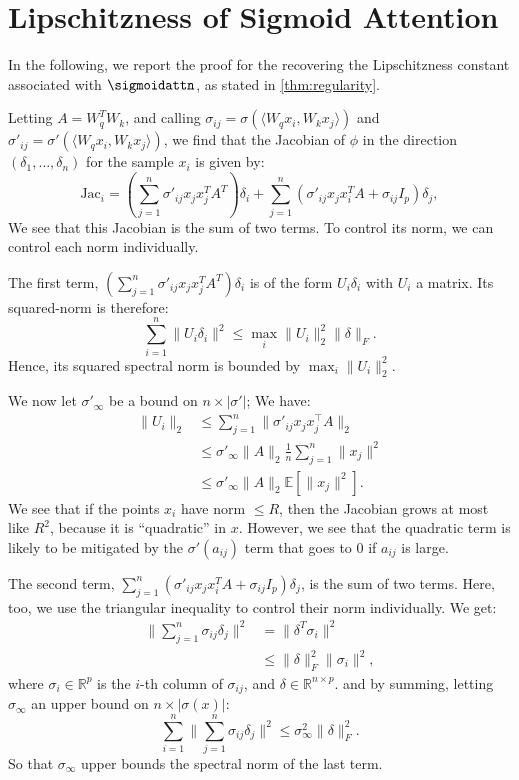 \section{Lipschitzness of Sigmoid Attention}
\label{app:lipschitz_proof}
In the following, we report the proof for the recovering the Lipschitzness constant associated with $\sigmoidattn$, as stated in \cref{thm:regularity}.

Letting $A = W_q^T W_k$, and calling $\sigma_{ij} = \sigma(\langle W_qx_i, W_kx_j\rangle)$ and $\sigma'_{ij} = \sigma'(\langle W_qx_i, W_kx_j\rangle)$, we find that the Jacobian of $\phi$ in the direction $(\delta_1, \dots, \delta_n)$ for the sample $x_i$ is given by:
\begin{equation}
    \mathrm{Jac}_i = \left(\sum_{j=1}^n\sigma'_{ij}x_jx_j^TA^T\right)\delta_i +  \sum_{j=1}^n\left(\sigma'_{ij}x_jx_i^TA + \sigma_{ij}I_p\right)\delta_j,
\end{equation}
We see that this Jacobian is the sum of two terms. To control its norm, we can control each norm individually. 

The first term, $\left(\sum_{j=1}^n\sigma'_{ij}x_jx_j^TA^T\right)\delta_i$ is of the form $U_i\delta_i$ with $U_i$ a matrix. 
Its squared-norm is therefore:
\begin{equation}
    \sum_{i=1}^n \|U_i\delta_i\|^2 \leq \max_{i}\|U_i\|_2^2 \|\delta\|_F .
\end{equation}
Hence, its squared spectral norm is bounded by $\max_{i}\|U_i\|_2^2$.

We now let $\sigma'_{\infty}$ be a bound on $n\times |\sigma'|$; 
We have: 
\begin{align}
\|U_i\|_2 & \leq \sum_{j=1}^n\|\sigma'_{ij}x_jx_j^{\top}A\|_2 \\
& \leq \sigma'_{\infty}\|A\|_2\frac1n \sum_{j=1}^n \|x_j\|^2 \\
&\leq \sigma'_{\infty}\|A\|_2 \mathbb{E}[\|x_j\|^2].
\label{eqn:lip_bound_first}
\end{align}
We see that if the points $x_i$ have norm $\leq R$, then the Jacobian grows at most like $R^2$, because it is ``quadratic'' in $x$.
However, we see that the quadratic term is likely to be mitigated by the $\sigma'(a_{ij})$ term that goes to $0$ if $a_{ij}$ is large.

The second term, $\sum_{j=1}^n\left(\sigma'_{ij}x_jx_i^TA + \sigma_{ij}I_p\right)\delta_j$, is the sum of two terms. Here, too, we use the triangular inequality to control their norm individually. We get:
\begin{align}
    \|\sum_{j=1}^n\sigma_{ij}\delta_j\|^2 &=\|\delta^T \sigma_i\|^2 \\
    &\leq \|\delta\|_F^2 \|\sigma_i\|^2,
\end{align}
where $\sigma_i\in\mathbb{R}^p$ is the $i$-th column of $\sigma_{ij}$, and $\delta\in \mathbb{R}^{n\times p}$.
and by summing, letting $\sigma_{\infty}$ an upper bound on $n\times |\sigma(x)|$:
\begin{equation}
    \sum_{i=1}^n\|\sum_{j=1}^n\sigma_{ij}\delta_j\|^2 \leq \sigma_{\infty}^2 \|\delta\|_F^2 .
\end{equation}
So that $\sigma_{\infty}$ upper bounds the spectral norm of the last term.

